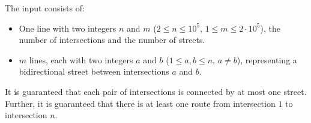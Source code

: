 
	The input consists of:
	\begin{itemize}
		\item One line with two integers $n$ and $m$ ($2 \le n \le 10^5$, $1 \le m \le 2 \cdot 10^5$),
			the number of intersections and the number of streets.
		\item $m$ lines, each with two integers $a$ and $b$ ($1 \le a, b \le n$, $a \ne b$),
			representing a bidirectional street between intersections $a$ and $b$.
	\end{itemize}
	It is guaranteed that each pair of intersections is connected by at most one street.
	Further, it is guaranteed that there is at least one route from intersection $1$ to intersection $n$.
